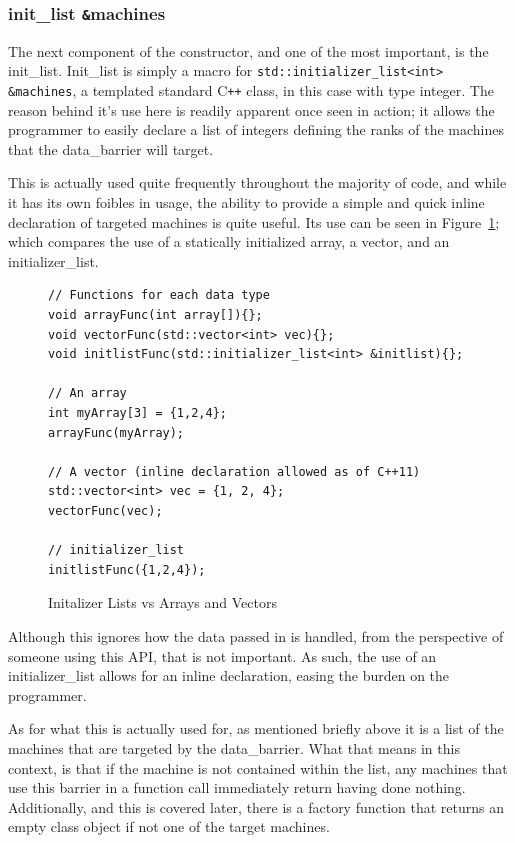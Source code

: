 \documentclass[../thesis.tex]{subfiles}
\begin{document}
  \subsubsection{init\_list \texttt{\&}machines} %
  \label{ssub:init_list}
    The next component of the constructor, and one of the most important, is the init\_list. Init\_list is simply a macro for \texttt{std::initializer\_list<int> \&machines}, a templated standard C\texttt{++} class, in this case with type integer. The reason behind it's use here is readily apparent once seen in action; it allows the programmer to easily declare a list of integers defining the ranks of the machines that the data\_barrier will target.

    This is actually used quite frequently throughout the majority of code, and while it has its own foibles in usage, the ability to provide a simple and quick inline declaration of targeted machines is quite useful. Its use can be seen in Figure~\ref{fig:init_list_vs_others}; which compares the use of a statically initialized array, a vector, and an initializer\_list.

     \begin{figure}[htbp]
      \centering

      \lstset{language=cpp}  
      \begin{lstlisting}[tabsize=2]
// Functions for each data type
void arrayFunc(int array[]){};
void vectorFunc(std::vector<int> vec){};
void initlistFunc(std::initializer_list<int> &initlist){};

// An array
int myArray[3] = {1,2,4};
arrayFunc(myArray);

// A vector (inline declaration allowed as of C++11)
std::vector<int> vec = {1, 2, 4};
vectorFunc(vec);

// initializer_list
initlistFunc({1,2,4});
        \end{lstlisting}
      \caption{Initalizer Lists vs Arrays and Vectors}
      \label{fig:init_list_vs_others}
    \end{figure}

    Although this ignores how the data passed in is handled, from the perspective of someone using this API, that is not important. As such, the use of an initializer\_list allows for an inline declaration, easing the burden on the programmer.

    As for what this is actually used for, as mentioned briefly above it is a list of the machines that are targeted by the data\_barrier. What that means in this context, is that if the machine is not contained within the list, any machines that use this barrier in a function call immediately return having done nothing. Additionally, and this is covered later, there is a factory function that returns an empty class object if not one of the target machines.
\end{document}
